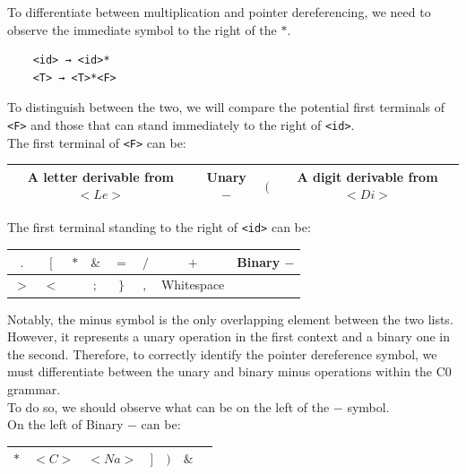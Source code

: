 To differentiate between multiplication and pointer dereferencing, we need to observe the immediate symbol to the right of the \(\ast\).

\begin{verbatim}
    <id> → <id>*
    <T> → <T>*<F>
\end{verbatim}

To distinguish between the two, we will compare the potential first terminals of \texttt{<F>} and those that can stand immediately to the right of \texttt{<id>}. \\

The first terminal of \texttt{<F>} can be:
\begin{center}
    \begin{tabular}{|c|c|c|c|}
        \hline
        A letter derivable from \( <Le> \) & Unary \( - \) & \( ( \) & A digit derivable from \( <Di> \) \\
        \hline
    \end{tabular}
\end{center}

The first terminal standing to the right of \texttt{<id>} can be:
\begin{center}
    \begin{tabular}{|c|c|c|c|c|c|c|c|}
        \hline
        \( . \) & \( [ \) & \( \ast \) & \( \& \) & \( = \) & \( / \) & \( + \) & Binary \( - \)\\
        \hline
        \( > \) & \( < \) & \( \! \) & \( ; \) & \( \} \) & \( , \) & Whitespace & \\
        \hline
    \end{tabular}
\end{center}

Notably, the minus symbol is the only overlapping element between the two lists. However, it represents a unary operation in the first context and a binary one in the second. Therefore, to correctly identify the pointer dereference symbol, we must differentiate between the unary and binary minus operations within the C0 grammar. \\

To do so, we should observe what can be on the left of the \(-\) symbol. \\

On the left of Binary \(-\) can be:
\begin{center}
    \begin{tabular}{|c|c|c|c|c|c|c|}
        \hline
        \( * \) & \( <C> \) & \( <Na> \) & \( ] \) & \( ) \) & \( \& \)\\
        \hline
    \end{tabular}
\end{center}

